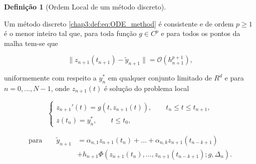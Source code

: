 \documentclass{beamer}
\theoremstyle{plain}
\theoremstyle{definition}
\newtheorem{defi}{Definição}
\begin{document}
    \begin{frame}

        \small
        \begin{defi}[Ordem Local de um método discreto]
            \label{chap3:def:order_of_discrete_methods}

            Um método discreto \eqref{chap3:def:eq:ODE_method}  é consistente e de ordem $p \geq 1$ é o menor inteiro tal que, para toda função $g \in C^p$ e para todos os pontos da malha tem-se que 

            \begin{equation}
                \| z_{n+1}(t_{n+1}) - \tilde{y}_{n+1} \| = \mathcal{O} (h_{n+1}^{p+1}), 
                \label{chap3:eq:order_of_discrete_methods:1}
            \end{equation}

            \noindent
            uniformemente com respeito a $y_{n}^*$ em qualquer conjunto limitado de $R^d$ e para $n = 0, ..., N-1$, onde $z_{n+1}(t)$ é solução do problema local

            \begin{equation}
                \begin{cases}
                    z_{n+1}'(t) = g(t, z_{n+1}(t)), \qquad t_n \leq t \leq t_{n+1} , \\
                    z(t_n) = y_n ^*, \qquad t \leq t_0,
                \end{cases}
                \label{chap3:eq:order_of_discrete_methods:2}
            \end{equation}


            \begin{equation}
                \begin{split}
                    \text{para} \qquad 
                    \tilde{y}_{n+1} &= \alpha_{n, 1} z_{n+1}(t_n) + \dots + \alpha_{n, k} z_{n+1}(t_{n-k+1}) \\
                                   &+ h_{n+1} \Phi(z_{n+1}(t_n), \dots, z_{n+1}(t_{n-k+1}); g, \Delta_n).
                \end{split}
                \label{chap3:eq:order_of_discrete_methods:3}
            \end{equation}

        \end{defi}

\end{frame}



\end{document}
